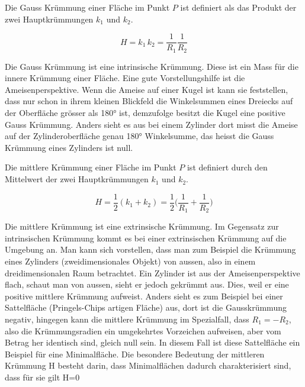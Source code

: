 \begin{refsection}

Die Gauss Krümmung einer Fläche im Punkt $P$ ist definiert als das Produkt der zwei Hauptkrümmungen $k_1$ und $k_2$.

\begin{equation} \label{Gauss_Kruemmung_D}
  H=k_1\, k_2= \frac{1}{R_1}\frac{1}{R_2}
\end{equation}



Die Gauss Krümmung ist eine intrinsische Krümmung. Diese ist  ein Mass für die innere Krümmung einer Fläche. 
Eine gute Vorstellungshilfe ist die Ameisenperspektive. 
Wenn die Ameise auf einer Kugel ist kann sie feststellen, dass nur schon in ihrem kleinen Blickfeld die Winkelsummen eines Dreiecks auf der Oberfläche grösser als 180° ist, demzufolge besitzt die Kugel eine positive Gauss Krümmung. Anders sieht es aus bei einem Zylinder dort misst die Ameise auf der Zylinderoberfläche genau 180° Winkelsumme, das heisst die Gauss Krümmung eines Zylinders ist null.


Die mittlere Krümmung einer Fläche im Punkt $P$ ist definiert durch den Mittelwert der zwei Hauptkrümmungen $k_1$ und $k_2$.

\begin{equation} \label{Mittlere Kruemmung_D}
  H=\frac{1}{2}(k_1+k_2)= \frac{1}{2}\bigg(\frac{1}{R_1}+\frac{1}{R_2}\bigg)
\end{equation}

Die mittlere Krümmung ist eine extrinsische Krümmung. 
Im Gegensatz zur intrinsischen Krümmung kommt es bei einer extrinsischen Krümmung auf die Umgebung an. 
Man kann sich vorstellen, dass man zum Beispiel die Krümmung eines Zylinders (zweidimensionales Objekt) von aussen, also in einem dreidimensionalen Raum betrachtet. 
Ein Zylinder ist aus der Ameisenperspektive flach, schaut man von aussen, sieht er jedoch gekrümmt aus.
Dies, weil er eine positive mittlere Krümmung aufweist. 
Anders sieht es zum Beispiel bei einer Sattelfläche (Pringels-Chips artigen Fläche) aus, dort ist die Gausskrümmung negativ, hingegen kann die mittlere Krümmung im Spezialfall, dass $R_1=-R_2$, also die Krümmungsradien ein umgekehrtes Vorzeichen aufweisen, aber vom Betrag her identisch sind, gleich null sein. 
In diesem Fall ist diese Sattelfläche ein Beispiel für eine Minimalfläche.
Die besondere Bedeutung der mittleren Krümmung H besteht darin, dass Minimalflächen dadurch charakterisiert sind, dass für sie gilt H=0


\end{refsection}
